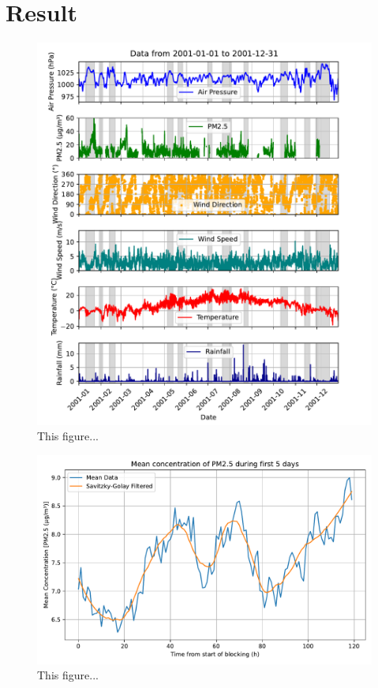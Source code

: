 \section{Result}

\begin{figure}[H]
    \centering    \includegraphics[width=1\textwidth]{Figures/plot_20010101_20011231.pdf}
    \caption{This figure...}
    \label{fig:example}
\end{figure}

\begin{figure}[H]
    \centering    \includegraphics[width=1\textwidth]{Figures/Meanplot.pdf}
    \caption{This figure...}
    \label{fig:Meanplot}
\end{figure}


